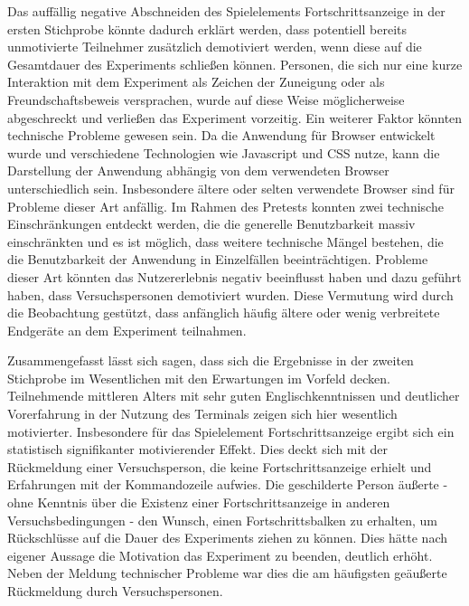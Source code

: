 Das auffällig negative Abschneiden des Spielelements Fortschrittsanzeige in der ersten Stichprobe könnte dadurch erklärt werden, dass potentiell bereits unmotivierte Teilnehmer zusätzlich demotiviert werden, wenn diese auf die Gesamtdauer des Experiments schließen können. Personen, die sich nur eine kurze Interaktion mit dem Experiment als Zeichen der Zuneigung oder als Freundschaftsbeweis versprachen, wurde auf diese Weise möglicherweise abgeschreckt und verließen das Experiment vorzeitig. Ein weiterer Faktor könnten technische Probleme gewesen sein. Da die Anwendung für Browser entwickelt wurde und verschiedene Technologien wie Javascript und CSS nutze, kann die Darstellung der Anwendung abhängig von dem verwendeten Browser unterschiedlich sein. Insbesondere ältere oder selten verwendete Browser sind für Probleme dieser Art anfällig. Im Rahmen des Pretests konnten zwei technische Einschränkungen entdeckt werden, die die generelle Benutzbarkeit massiv einschränkten und es ist möglich, dass weitere technische Mängel bestehen, die die Benutzbarkeit der Anwendung in Einzelfällen beeinträchtigen. Probleme dieser Art könnten das Nutzererlebnis negativ beeinflusst haben und dazu geführt haben, dass Versuchspersonen demotiviert wurden. Diese Vermutung wird durch die Beobachtung gestützt, dass anfänglich häufig ältere oder wenig verbreitete Endgeräte an dem Experiment teilnahmen.  

Zusammengefasst lässt sich sagen, dass sich die Ergebnisse in der zweiten Stichprobe im Wesentlichen mit den Erwartungen im Vorfeld decken. Teilnehmende mittleren Alters mit sehr guten Englischkenntnissen und deutlicher Vorerfahrung in der Nutzung des Terminals zeigen sich hier wesentlich motivierter. Insbesondere für das Spielelement Fortschrittsanzeige ergibt sich ein statistisch signifikanter motivierender Effekt. Dies deckt sich mit der Rückmeldung einer Versuchsperson, die keine Fortschrittsanzeige erhielt und Erfahrungen mit der Kommandozeile aufwies. Die geschilderte Person äußerte - ohne Kenntnis über die Existenz einer Fortschrittsanzeige in anderen Versuchsbedingungen - den Wunsch, einen Fortschrittsbalken zu erhalten, um Rückschlüsse auf die Dauer des Experiments ziehen zu können. Dies hätte nach eigener Aussage die Motivation das Experiment zu beenden, deutlich erhöht. Neben der Meldung technischer Probleme war dies die am häufigsten geäußerte Rückmeldung durch Versuchspersonen. 

